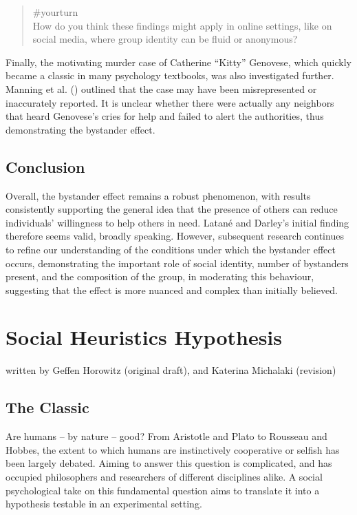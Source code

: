 \documentclass[
  letterpaper,
]{book}
\begin{document}
\begin{quote}
{\#yourturn}\\
How do you think these findings might apply in online settings, like on
social media, where group identity can be fluid or anonymous?
\end{quote}

Finally, the motivating murder case of Catherine ``Kitty'' Genovese,
which quickly became a classic in many psychology textbooks, was also
investigated further. Manning et al.
() outlined that the case may
have been misrepresented or inaccurately reported. It is unclear whether
there were actually any neighbors that heard Genovese's cries for help
and failed to alert the authorities, thus demonstrating the bystander
effect.

\section{Conclusion}\label{conclusion-19}

Overall, the bystander effect remains a robust phenomenon, with results
consistently supporting the general idea that the presence of others can
reduce individuals' willingness to help others in need. Latané and
Darley's initial finding therefore seems valid, broadly speaking.
However, subsequent research continues to refine our understanding of
the conditions under which the bystander effect occurs, demonstrating
the important role of social identity, number of bystanders present, and
the composition of the group, in moderating this behaviour, suggesting
that the effect is more nuanced and complex than initially believed.


\chapter{\texorpdfstring{{Social Heuristics
Hypothesis}}{Social Heuristics Hypothesis}}\label{social-heuristics-hypothesis}

{written by Geffen Horowitz (original draft), and Katerina Michalaki
(revision)}

\section{The Classic}\label{the-classic-18}

Are humans -- by nature -- good? From Aristotle and Plato to Rousseau
and Hobbes, the extent to which humans are instinctively cooperative or
selfish has been largely debated. Aiming to answer this question is
complicated, and has occupied philosophers and researchers of different
disciplines alike. A social psychological take on this fundamental
question aims to translate it into a hypothesis testable in an
experimental setting.
\end{document}
